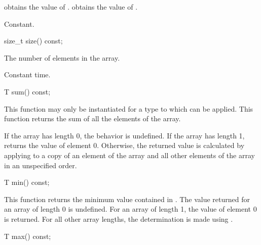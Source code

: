 \begin{itemdescr}
\pnum
\effects {} obtains the value of
.  obtains the value of .

\pnum
\complexity Constant.
\end{itemdescr}

%
\begin{itemdecl}
size_t size() const;
\end{itemdecl}

\begin{itemdescr}
\pnum
\returns The number of elements in the array.

\pnum
\complexity Constant time.
\end{itemdescr}

%
\begin{itemdecl}
T sum() const;
\end{itemdecl}

\begin{itemdescr}
This function may only be instantiated for a type  to which
can be applied.
This function returns the sum of all the elements of the array.

\pnum
If the array has length 0, the behavior is undefined.%
If the array has length 1,
returns the value of element 0.
Otherwise, the returned value is calculated by applying
to a copy of an element of the array and
all other elements of the array in an unspecified order.%
\end{itemdescr}

%
\begin{itemdecl}
T min() const;
\end{itemdecl}

\begin{itemdescr}
\pnum
This function returns the minimum value contained in
.
The value returned for an array of length 0 is undefined.
For an array
of length 1, the value of element 0 is returned.
For all other array
lengths, the determination is made using
.
\end{itemdescr}

%
\begin{itemdecl}
T max() const;
\end{itemdecl}

